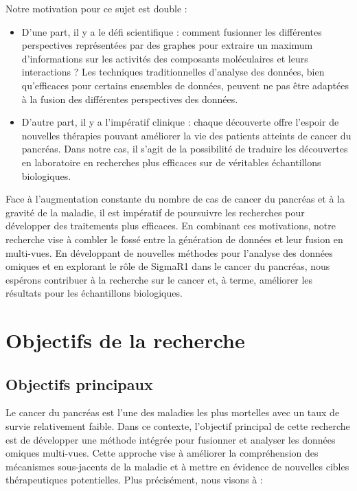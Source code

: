 Notre motivation pour ce sujet est double : 
\begin{itemize}
\item D'une part, il y a le défi scientifique : comment fusionner les différentes perspectives représentées par des graphes pour extraire un maximum d'informations sur les activités des composants moléculaires et leurs interactions ? Les techniques traditionnelles d'analyse des données, bien qu'efficaces pour certains ensembles de données, peuvent ne pas être adaptées à la fusion des différentes perspectives des données.
\item D'autre part, il y a l'impératif clinique : chaque découverte offre l'espoir de nouvelles thérapies pouvant améliorer la vie des patients atteints de cancer du pancréas. Dans notre cas, il s'agit de la possibilité de traduire les découvertes en laboratoire en recherches plus efficaces sur de véritables échantillons biologiques.
\end{itemize}

Face à l'augmentation constante du nombre de cas de cancer du pancréas et à la gravité de la maladie, il est impératif de poursuivre les recherches pour développer des traitements plus efficaces. En combinant ces motivations, notre recherche vise à combler le fossé entre la génération de données et leur fusion en multi-vues. En développant de nouvelles méthodes pour l'analyse des données omiques et en explorant le rôle de SigmaR1 dans le cancer du pancréas, nous espérons contribuer à la recherche sur le cancer et, à terme, améliorer les résultats pour les échantillons biologiques.


\section{Objectifs de la recherche}

\subsection{Objectifs principaux}

Le cancer du pancréas est l'une des maladies les plus mortelles avec un taux de survie relativement faible. Dans ce contexte, l'objectif principal de cette recherche est de développer une méthode intégrée pour fusionner et analyser les données omiques multi-vues. Cette approche vise à améliorer la compréhension des mécanismes sous-jacents de la maladie et à mettre en évidence de nouvelles cibles thérapeutiques potentielles. Plus précisément, nous visons à :


